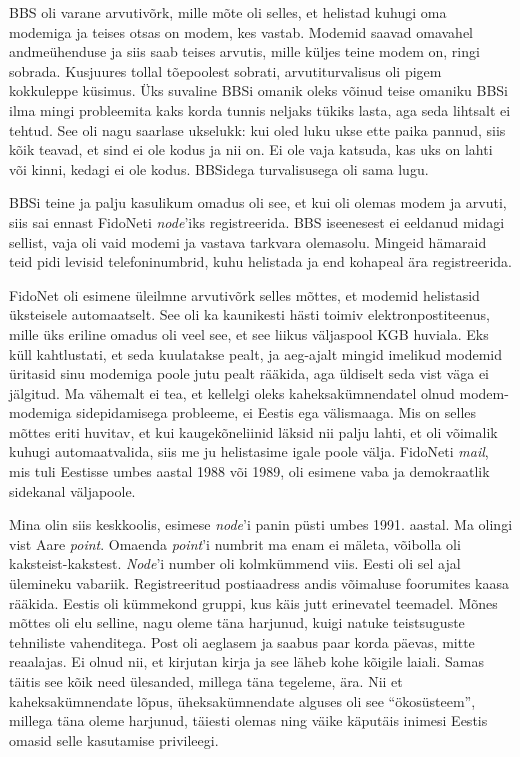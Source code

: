 BBS oli varane arvutivõrk, mille mõte oli selles, et helistad 
kuhugi oma modemiga ja teises otsas on modem, kes vastab. Modemid saavad 
omavahel andmeühenduse ja siis saab teises arvutis, mille 
küljes teine modem on, ringi sobrada. Kusjuures tollal tõepoolest
sobrati, arvutiturvalisus oli pigem kokkuleppe 
küsimus. Üks suvaline BBSi omanik oleks võinud teise 
omaniku BBSi ilma mingi 
probleemita kaks korda tunnis neljaks tükiks lasta, aga seda lihtsalt ei 
tehtud. See oli nagu 
saarlase ukselukk: kui oled luku ukse ette paika pannud, siis kõik 
teavad, et sind ei ole kodus ja nii on. Ei ole vaja katsuda, kas uks 
on lahti või kinni, kedagi ei ole kodus. BBSidega turvalisusega oli sama lugu. 

BBSi teine ja palju kasulikum omadus oli see, et kui 
oli olemas modem ja arvuti, siis sai ennast FidoNeti 
\emph{node}'iks registreerida. BBS iseenesest ei eeldanud midagi sellist, vaja 
oli vaid
modemi ja vastava tarkvara olemasolu. Mingeid hämaraid teid pidi levisid 
telefoninumbrid, kuhu helistada ja end kohapeal ära registreerida.

FidoNet oli esimene üleilmne arvutivõrk selles 
mõttes, et modemid helistasid üksteisele automaatselt. See oli ka kaunikesti 
hästi toimiv elektronpostiteenus, mille üks eriline omadus 
oli veel see, et see liikus väljaspool KGB huviala. Eks küll 
kahtlustati, et seda kuulatakse pealt, ja aeg-ajalt mingid imelikud modemid 
üritasid sinu modemiga poole jutu pealt rääkida, aga üldiselt seda vist väga ei 
jälgitud. Ma vähemalt ei tea, et kellelgi oleks 
kaheksakümnendatel olnud modem-modemiga sidepidamisega probleeme, ei Eestis ega 
välismaaga. Mis on selles mõttes eriti huvitav, et kui kaugekõneliinid läksid 
nii palju lahti, et oli võimalik kuhugi automaatvalida, siis me ju helistasime 
igale poole välja.  
FidoNeti \emph{mail}, mis tuli Eestisse umbes aastal 1988 või 1989, oli esimene 
vaba ja 
demokraatlik sidekanal väljapoole.

Mina olin siis keskkoolis, esimese \emph{node}'i panin püsti umbes 1991. 
aastal. Ma olingi vist Aare \emph{point}. 
Omaenda \emph{point}'i numbrit ma enam ei mäleta, võibolla oli 
kaksteist-kakstest. \emph{Node}'i number oli
kolmkümmend viis. Eesti oli sel ajal ülemineku vabariik. 
Registreeritud postiaadress andis võimaluse foorumites 
kaasa rääkida. Eestis oli kümmekond gruppi, kus käis jutt erinevatel 
teemadel. Mõnes mõttes oli elu selline, nagu oleme täna 
harjunud, kuigi natuke teistsuguste tehniliste vahenditega. Post oli aeglasem 
ja 
saabus paar korda 
päevas, mitte reaalajas. Ei olnud nii, et kirjutan kirja ja see läheb kohe 
kõigile laiali. Samas täitis see kõik need ülesanded, millega täna tegeleme, 
ära. Nii et kaheksakümnendate lõpus, üheksakümnendate alguses oli see 
\enquote{ökosüsteem}, millega täna oleme harjunud, täiesti olemas ning 
väike käputäis inimesi Eestis omasid selle kasutamise privileegi. 


